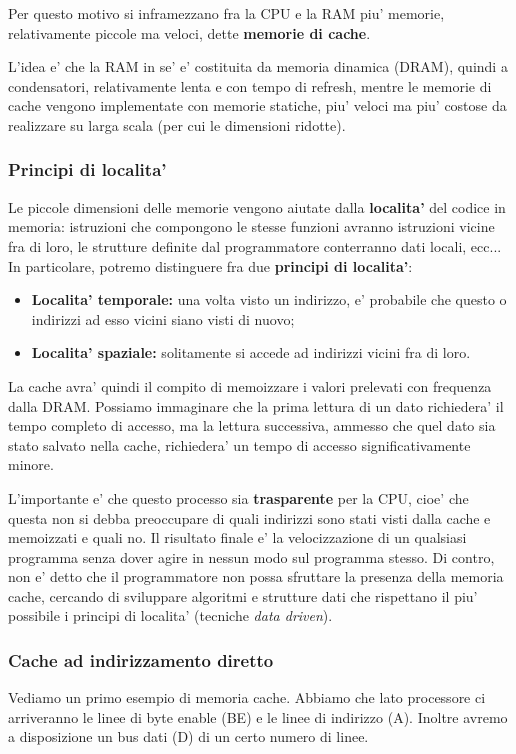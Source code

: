\documentclass[a4paper,11pt]{article}
\begin{document}
Per questo motivo si inframezzano fra la CPU e la RAM piu' memorie, relativamente piccole ma veloci, dette \textbf{memorie di cache}.

L'idea e' che la RAM in se' e' costituita da memoria dinamica (DRAM), quindi a condensatori, relativamente lenta e con tempo di refresh, mentre le memorie di cache vengono implementate con memorie statiche, piu' veloci ma piu' costose da realizzare su larga scala (per cui le dimensioni ridotte).

\subsubsection{Principi di localita'}
Le piccole dimensioni delle memorie vengono aiutate dalla \textbf{localita'} del codice in memoria: istruzioni che compongono le stesse funzioni avranno istruzioni vicine fra di loro, le strutture definite dal programmatore conterranno dati locali, ecc...
In particolare, potremo distinguere fra due \textbf{principi di localita'}:
\begin{itemize}
	\item \textbf{Localita' temporale:} una volta visto un indirizzo, e' probabile che questo o indirizzi ad esso vicini siano visti di nuovo;
	\item \textbf{Localita' spaziale:} solitamente si accede ad indirizzi vicini fra di loro.
\end{itemize}

\par\smallskip

La cache avra' quindi il compito di memoizzare i valori prelevati con frequenza dalla DRAM.
Possiamo immaginare che la prima lettura di un dato richiedera' il tempo completo di accesso, ma la lettura successiva, ammesso che quel dato sia stato salvato nella cache, richiedera' un tempo di accesso significativamente minore.

L'importante e' che questo processo sia \textbf{trasparente} per la CPU, cioe' che questa non si debba preoccupare di quali indirizzi sono stati visti dalla cache e memoizzati e quali no.
Il risultato finale e' la velocizzazione di un qualsiasi programma senza dover agire in nessun modo sul programma stesso.
Di contro, non e' detto che il programmatore non possa sfruttare la presenza della memoria cache, cercando di sviluppare algoritmi e strutture dati che rispettano il piu' possibile i principi di localita' (tecniche \textit{data driven}).

\subsubsection{Cache ad indirizzamento diretto}
Vediamo un primo esempio di memoria cache.
Abbiamo che lato processore ci arriveranno le linee di byte enable (BE) e le linee di indirizzo (A).
Inoltre avremo a disposizione un bus dati (D) di un certo numero di linee.
\end{document}
